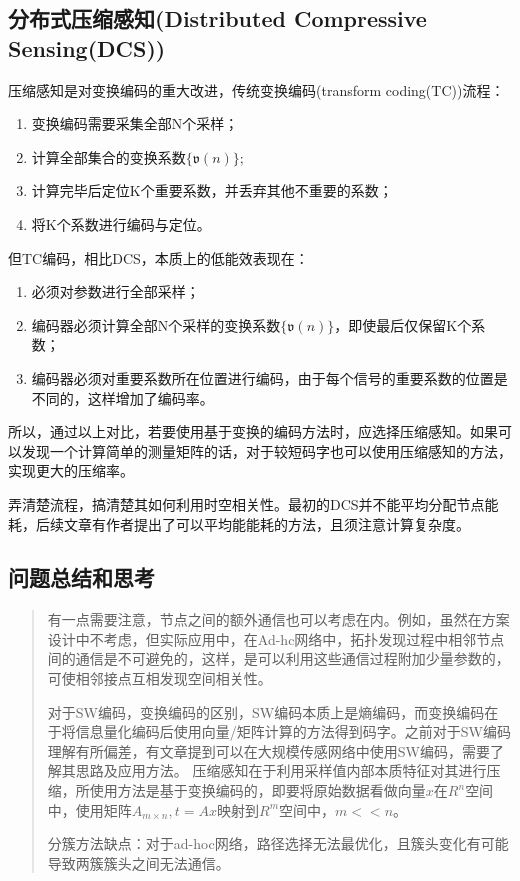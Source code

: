 \subsection{分布式压缩感知(Distributed Compressive Sensing(DCS))}
压缩感知是对变换编码的重大改进，传统变换编码(transform coding(TC))流程：
\begin{enumerate}
    \item 变换编码需要采集全部N个采样；
    \item 计算全部集合的变换系数$\{\mathfrak{v}(n)\}$;
    \item 计算完毕后定位K个重要系数，并丢弃其他不重要的系数；
    \item 将K个系数进行编码与定位。
\end{enumerate}
但TC编码，相比DCS，本质上的低能效表现在：
\begin{enumerate}
    \item 必须对参数进行全部采样；
    \item 编码器必须计算全部N个采样的变换系数$\{\mathfrak{v}(n)\}$，即使最后仅保留K个系数；
    \item 编码器必须对重要系数所在位置进行编码，由于每个信号的重要系数的位置是不同的，这样增加了编码率。
\end{enumerate}

所以，通过以上对比，若要使用基于变换的编码方法时，应选择压缩感知。如果可以发现一个计算简单的测量矩阵的话，对于较短码字也可以使用压缩感知的方法，实现更大的压缩率。

弄清楚流程，搞清楚其如何利用时空相关性。最初的DCS并不能平均分配节点能耗，后续文章有作者提出了可以平均能能耗的方法，且须注意计算复杂度。

\subsection{问题总结和思考}
\begin{quote}	
	有一点需要注意，节点之间的额外通信也可以考虑在内。例如，虽然在方案设计中不考虑，但实际应用中，在Ad-hc网络中，拓扑发现过程中相邻节点间的通信是不可避免的，这样，是可以利用这些通信过程附加少量参数的，可使相邻接点互相发现空间相关性。
	
	对于SW编码，变换编码的区别，SW编码本质上是熵编码，而变换编码在于将信息量化编码后使用向量/矩阵计算的方法得到码字。\textcolor[rgb]{1,0,0}{之前对于SW编码理解有所偏差，有文章提到可以在大规模传感网络中使用SW编码，需要了解其思路及应用方法}。
	压缩感知在于利用采样值内部本质特征对其进行压缩，所使用方法是基于变换编码的，即要将原始数据看做向量$x$在$R^n$空间中，使用矩阵$A_{m\times n}, t=Ax$映射到$R^m$空间中，$m<<n$。
	
	
	分簇方法缺点：对于ad-hoc网络，路径选择无法最优化，且簇头变化有可能导致两簇簇头之间无法通信。
	
\end{quote}